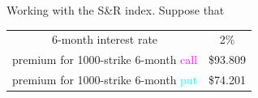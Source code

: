 \begin{frame}[fragile,t]
\begin{myexample}
	\label{E:3-1-0}
	Working with the S\&R index. Suppose that

	\begin{center}
		\renewcommand{\arraystretch}{1.2}
		\begin{tabular}{|c|c|}
			\hline
			6-month interest rate                                     & 2\%      \\
			premium for 1000-strike 6-month \textcolor{magenta}{call} & \$93.809 \\
			premium for 1000-strike 6-month \textcolor{cyan}{put}     & \$74.201 \\ \hline
		\end{tabular}
	\end{center}


\end{myexample}
\end{frame}
